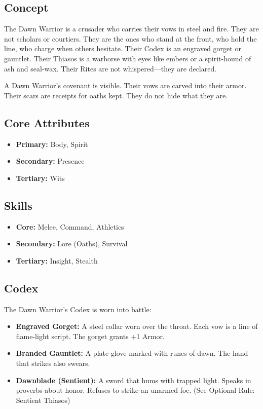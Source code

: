 \subsection{Concept}

The Dawn Warrior is a crusader who carries their vows in steel and fire. They are not scholars or courtiers. They are the ones who stand at the front, who hold the line, who charge when others hesitate. Their Codex is an engraved gorget or gauntlet. Their Thiasos is a warhorse with eyes like embers or a spirit-hound of ash and seal-wax. Their Rites are not whispered—they are declared.

A Dawn Warrior's covenant is visible. Their vows are carved into their armor. Their scars are receipts for oaths kept. They do not hide what they are.

\subsection{Core Attributes}

\begin{itemize}
\item \textbf{Primary:} Body, Spirit
\item \textbf{Secondary:} Presence
\item \textbf{Tertiary:} Wits
\end{itemize}

\subsection{Skills}

\begin{itemize}
\item \textbf{Core:} Melee, Command, Athletics
\item \textbf{Secondary:} Lore (Oaths), Survival
\item \textbf{Tertiary:} Insight, Stealth
\end{itemize}

\subsection{Codex}

The Dawn Warrior's Codex is worn into battle:

\begin{itemize}
\item \textbf{Engraved Gorget:} A steel collar worn over the throat. Each vow is a line of flame-light script. The gorget grants +1 Armor.
\item \textbf{Branded Gauntlet:} A plate glove marked with runes of dawn. The hand that strikes also swears.
\item \textbf{Dawnblade (Sentient):} A sword that hums with trapped light. Speaks in proverbs about honor. Refuses to strike an unarmed foe. (See Optional Rule: Sentient Thiasos)
\end{itemize}

